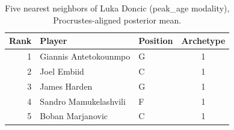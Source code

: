 \begin{table}[htbp]
  \centering\small
  \begin{tabular}{rllc}
    \toprule
    Rank & Player & Position & Archetype \\
    \midrule
    1 & Giannis Antetokounmpo & G & 1 \\
    2 & Joel Embiid & C & 1 \\
    3 & James Harden & G & 1 \\
    4 & Sandro Mamukelashvili & F & 1 \\
    5 & Boban Marjanovic & C & 1 \\
    \bottomrule
  \end{tabular}
  \caption{Five nearest neighbors of Luka Doncic (peak_age modality), Procrustes-aligned posterior mean.}
  \label{tab:Luka_Doncic_neighbors_peak_age}
\end{table}

